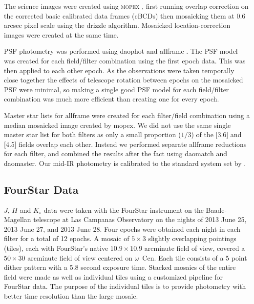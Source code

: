 \documentclass[a4paper,fleqn,usenatbib]{mnras}
\begin{document}
The science images were created using \textsc{mopex} \citep{2006SPIE.6274E..0CM}, first running overlap correction on the corrected basic calibrated data frames (cBCDs) then mosaicking them at 0.6 arcsec pixel scale using the drizzle algorithm. Mosaicked location-correction images were created at the same time. 

PSF photometry was performed using {\sc daophot} and {\sc allframe} \citep{1987PASP...99..191S, 1994PASP..106..250S}. The PSF model was created for each field/filter combination using the first epoch data. This was then applied to each other epoch. As the observations were taken temporally close together the effects of telescope rotation between epochs on the mosaicked PSF were minimal, so making a single good PSF model for each field/filter combination was much more efficient than creating one for every epoch. 

Master star lists for {\sc allframe} were created for each filter/field combination using a median mosaicked image created by {\sc mopex}. We did not use the same single master star list for both filters as only a small proportion ($1/3$) of the [3.6] and [4.5] fields overlap each other. Instead we performed separate {\sc allframe} reductions for each filter, and combined the results after the fact using {\sc daomatch} and {\sc daomaster}. Our mid-IR photometry is calibrated to the standard system set by \citet{2005PASP..117..978R}.

\subsection{FourStar Data}
\label{sec:fourstar_reduction}

$J$, $H$ and $K_s$ data were taken with the FourStar instrument on the Baade-Magellan telescope at Las Campanas Observatory \citep{2013PASP..125..654P} on the nights of 2013 June 25, 2013 June 27, and 2013 June 28. Four epochs were obtained each night in each filter for a total of 12 epochs. A mosaic of $5\times3$ slightly overlapping pointings (tiles), each with FourStar's native $10.9 \times 10.9$ arcminute field of view, covered a $50\times30$ arcminute field of view centered on $\omega$~Cen. Each tile consists of a 5 point dither pattern with a 5.8 second exposure time. Stacked mosaics of the entire field were made as well as individual tiles using a customized pipeline for FourStar data. The purpose of the individual tiles is to provide photometry with better time resolution than the large mosaic. 
\end{document}
